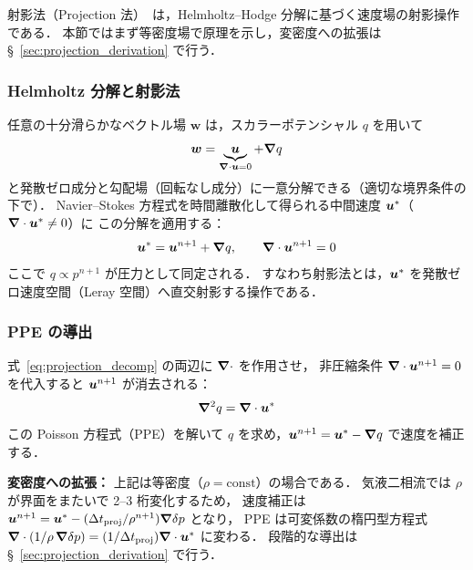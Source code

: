 射影法（Projection 法）~\cite{Chorin1968,Guermond2006}は，Helmholtz--Hodge 分解に基づく速度場の射影操作である．
本節ではまず等密度場で原理を示し，変密度への拡張は §~\ref{sec:projection_derivation} で行う．

\subsubsection{Helmholtz 分解と射影法}

任意の十分滑らかなベクトル場 $\bm{w}$ は，スカラーポテンシャル $q$ を用いて
\begin{equation}
  \bm{w} = \underbrace{\bm{u}}_{\bm{\nabla}\cdot\bm{u}=0}
           + \bm{\nabla} q
  \label{eq:helmholtz}
\end{equation}
と発散ゼロ成分と勾配場（回転なし成分）に一意分解できる（適切な境界条件の下で）．
Navier--Stokes 方程式を時間離散化して得られる中間速度 $\bm{u}^*$（$\bm{\nabla}\cdot\bm{u}^* \neq 0$）に
この分解を適用する：
\begin{equation}
  \bm{u}^* = \bm{u}^{n+1} + \bm{\nabla} q,
  \qquad \bm{\nabla}\cdot\bm{u}^{n+1}=0
  \label{eq:projection_decomp}
\end{equation}
ここで $q \propto p^{n+1}$ が圧力として同定される．
すなわち射影法とは，$\bm{u}^*$ を発散ゼロ速度空間（Leray 空間）へ直交射影する操作である．

\subsubsection{PPE の導出}

式~\eqref{eq:projection_decomp} の両辺に $\bm{\nabla}\cdot$ を作用させ，
非圧縮条件 $\bm{\nabla}\cdot\bm{u}^{n+1}=0$ を代入すると $\bm{u}^{n+1}$ が消去される：
\begin{equation}
  \bm{\nabla}^2q = \bm{\nabla}\cdot\bm{u}^*
  \label{eq:why_divergence}
\end{equation}
この Poisson 方程式（PPE）を解いて $q$ を求め，$\bm{u}^{n+1} = \bm{u}^* - \bm{\nabla} q$ で速度を補正する．

\noindent\textbf{変密度への拡張：}
上記は等密度（$\rho = \mathrm{const}$）の場合である．
気液二相流では $\rho$ が界面をまたいで 2--3 桁変化するため，
速度補正は
$\bm{u}^{n+1} = \bm{u}^* - (\Delta t_{\mathrm{proj}}/\rho^{n+1})\bm{\nabla}\delta p$ となり，
PPE は可変係数の楕円型方程式
$\bm{\nabla}\cdot(1/\rho\,\bm{\nabla}\delta p)
= (1/\Delta t_{\mathrm{proj}})\bm{\nabla}\cdot\bm{u}^*$ に変わる．
段階的な導出は §~\ref{sec:projection_derivation} で行う．



